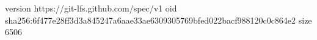 version https://git-lfs.github.com/spec/v1
oid sha256:6f477e28ff3d3a845247a6aae33ae6309305769bfed022bacf988120c0c864e2
size 6506

